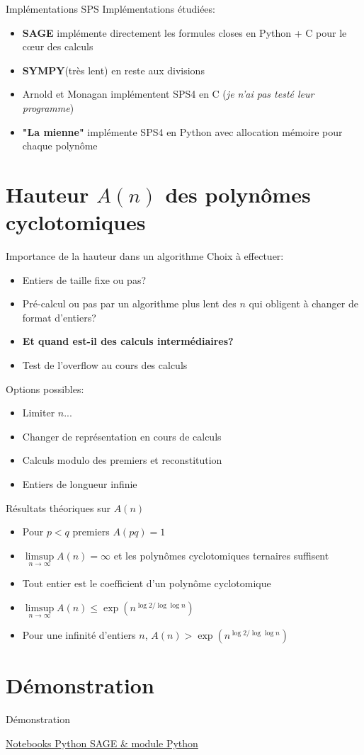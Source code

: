 \documentclass{beamer}
\begin{document}
	\begin{frame}{Implémentations SPS}
		Implémentations étudiées:
		\begin{itemize}
			\item 
			\textbf{SAGE} implémente directement les formules closes en Python + C pour le cœur des calculs
			\item \textbf{SYMPY}(très lent) en reste aux divisions
			\item Arnold et Monagan implémentent SPS4 en C (\textit{je n'ai pas testé leur programme})
			\item \textbf{"La mienne"} implémente SPS4 en Python avec allocation mémoire pour chaque polynôme
		\end{itemize}
	\end{frame}

	\section{Hauteur $A(n)$ des polynômes cyclotomiques}
	
	\begin{frame}{Importance de la hauteur dans un algorithme}
		Choix à effectuer:
		\begin{itemize}
			\item Entiers de taille fixe ou pas?
			\item Pré-calcul ou pas par un algorithme plus lent des $n$ qui obligent à changer de format d'entiers?
			\item \textbf{Et quand est-il des calculs intermédiaires?}
			\item Test de l'overflow au cours des calculs
		\end{itemize}
		Options possibles:
		\begin{itemize}
			\item Limiter $n$...
			\item Changer de représentation en cours de calculs
			\item Calculs modulo des premiers et reconstitution
			\item Entiers de longueur infinie
		\end{itemize}
	\end{frame}

	\begin{frame}{Résultats théoriques sur $A(n)$}
		\begin{itemize}
			\item Pour $p < q$ premiers $A(pq) = 1$
			\item $\limsup\limits_{n \to \infty} A(n) = \infty$ et les polynômes cyclotomiques ternaires suffisent
			\item Tout entier est le coefficient d'un polynôme cyclotomique
			\item $\limsup\limits_{n \to \infty} A(n) \le \exp(n^{\log 2 / \log \log n})$
			\item Pour une infinité d'entiers $n$, $A(n) > \exp(n^{\log 2 / \log \log n})$
		\end{itemize}		
	\end{frame}
		
	
	\section{Démonstration}
	\begin{frame}{Démonstration}
		
		\href{https://jupyter.math.sorbonne-universite.fr/user/21304439/lab}{Notebooks Python SAGE \& module Python}
		
	\end{frame}
	
\end{document}
